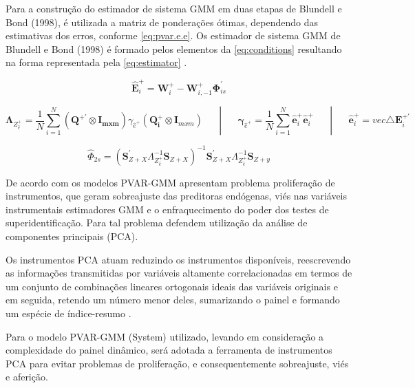 \documentclass[
  12pt,
  12pt,
  openright,
  oneside,
  a4paper,
  chapter=TITLE,
  section=TITLE,
  subsection=TITLE,
  subsubsection=TITLE,
  portugues,
  sumario=tradicional]{abntex2}
\begin{document}
Para a construção do estimador de sistema GMM em duas etapas de Blundell e Bond (1998), é utilizada a matriz de ponderações ótimas, dependendo das estimativas dos erros, conforme \autoref{eq:pvar.e.e}. Os estimador de sistema GMM de Blundell e Bond (1998) é formado pelos elementos da \autoref{eq:conditions} resultando na forma representada pela \autoref{eq:estimator} \cite{sigmund:2008}.

\begin{equation}\label{eq:pvar.e.e}
\mathbf{\hat{E}}_{i}^{+} = \mathbf{W}_{i}^{+} - \mathbf{W}_{i,-1}^{+}\mathbf{\Phi}_{is}^{'} 
\end{equation}

\begin{equation}\label{eq:conditions}
\mathbf{\Lambda}_{Z^{+}_{\hat{e}}} = \frac{1}{N}\sum_{i = 1}^{N}(\mathbf{Q^{+'}}\otimes\mathbf{I_{m x m}})\gamma_{\hat{e}^{+}}(\mathbf{Q_{i}^{+}}\otimes\mathbf{I}_{mxm})\hspace{20pt} |  \hspace{20pt}\mathbf{\gamma}_{\hat{e}^{+}} = \frac{1}{N}\sum_{i=1}^{N} \mathbf{\hat{e}}_{i}^{+} \mathbf{\hat{e}}_{i}^{+} \hspace{20pt} |  \hspace{20pt}\mathbf{\hat{e}}_{i}^{+} = vec{\triangle\mathbf{E}_{i}^{+'}} 
\end{equation}

\begin{equation}\label{eq:estimator}
\hat{\Phi}_{2s} =  (\mathbf{S}^{'}_{Z+X} \Lambda^{-1}_{Z^{+}_{\hat{e}}}\mathbf{S}_{Z+X})^{-1} \mathbf{S}^{'}_{Z+X} \Lambda^{-1}_{Z^{+}_{\hat{e}}}\mathbf{S}_{Z+y}
\end{equation}

De acordo com \textcite{bontempi:2015} os modelos PVAR-GMM apresentam problema proliferação de instrumentos, que geram sobreajuste das preditoras endógenas, viés nas variáveis instrumentais estimadores GMM e o enfraquecimento do poder dos testes de superidentificação. Para tal problema \textcite{bontempi:2015} defendem utilização da análise de componentes principais (PCA).

Os instrumentos PCA atuam reduzindo os instrumentos disponíveis, reescrevendo as informações transmitidas por variáveis altamente correlacionadas em termos de um conjunto de combinações lineares ortogonais ideais das variáveis originais e em seguida, retendo um número menor deles, sumarizando o painel e formando um espécie de índice-resumo \cite{bontempi:2015}.

Para o modelo PVAR-GMM (System) utilizado, levando em consideração a complexidade do painel dinâmico, será adotada a ferramenta de instrumentos PCA para evitar problemas de proliferação, e consequentemente sobreajuste, viés e aferição.
\end{document}
